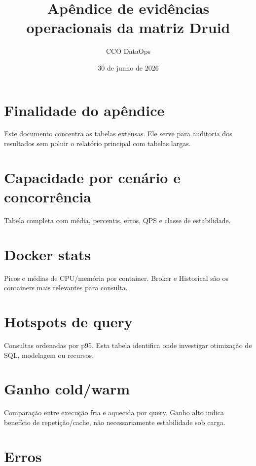 \documentclass[11pt,a4paper]{article}
\title{Apêndice de evidências operacionais da matriz Druid}
\author{CCO DataOps}
\date{30 de junho de 2026}
\begin{document}
\maketitle


\section{Finalidade do apêndice}

Este documento concentra as tabelas extensas. Ele serve para auditoria dos resultados sem poluir o relatório principal com tabelas largas.

\section{Capacidade por cenário e concorrência}

Tabela completa com média, percentis, erros, QPS e classe de estabilidade.



\clearpage

\section{Docker stats}

Picos e médias de CPU/memória por container. Broker e Historical são os containers mais relevantes para consulta.



\section{Hotspots de query}

Consultas ordenadas por p95. Esta tabela identifica onde investigar otimização de SQL, modelagem ou recursos.



\section{Ganho cold/warm}

Comparação entre execução fria e aquecida por query. Ganho alto indica benefício de repetição/cache, não necessariamente estabilidade sob carga.



\section{Erros}
\end{document}
